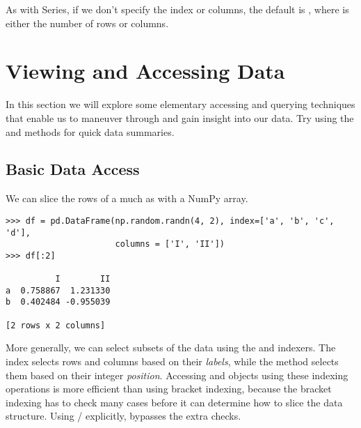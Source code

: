 As with Series, if we don't specify the index or columns, the default is
, where  is either the number of rows or columns.

\begin{comment} %
It is also possible to create multi-indexed arrays, for example:
\begin{lstlisting}
>>> grade=['eighth', 'ninth', 'tenth']
>>> subject=['math', 'science', 'english']
>>> myindex = pd.MultiIndex.from_product([grade, subject], names=['grade', 'subject'])
>>> myseries = pd.Series(np.random.randn(9), index=myindex)
>>> myseries
grade   subject
eighth  math       1.706644
        science   -0.899587
        english   -1.009832
ninth   math       2.096838
        science    1.884932
        english    0.413266
tenth   math      -0.924962
        science   -0.851689
        english    1.053329
dtype: float64
\end{lstlisting}

Multi-indexing is visually convenient, and will be explored further in Lab
\ref{lab:pandas3}, where we will discuss pandas pivot tables.
\end{comment}

\section*{Viewing and Accessing Data}

In this section we will explore some elementary accessing and querying
techniques that enable us to maneuver through and gain insight into our data.
Try using the  and  methods for quick data summaries.

\subsection*{Basic Data Access}

We can slice the rows of a  much as with a NumPy array.

\begin{lstlisting}
>>> df = pd.DataFrame(np.random.randn(4, 2), index=['a', 'b', 'c', 'd'],
                      columns = ['I', 'II'])
>>> df[:2]

          I        II
a  0.758867  1.231330
b  0.402484 -0.955039

[2 rows x 2 columns]
\end{lstlisting}

More generally, we can select subsets of the data using the  and
 indexers.
The  index selects rows and columns based on
their \emph{labels}, while the  method selects them based on their
integer \emph{position}.
Accessing  and  objects
using these indexing operations is more efficient than using bracket indexing, because the bracket indexing has to check many cases before it can determine how to slice the data structure.
Using / explicitly, bypasses the extra checks.


